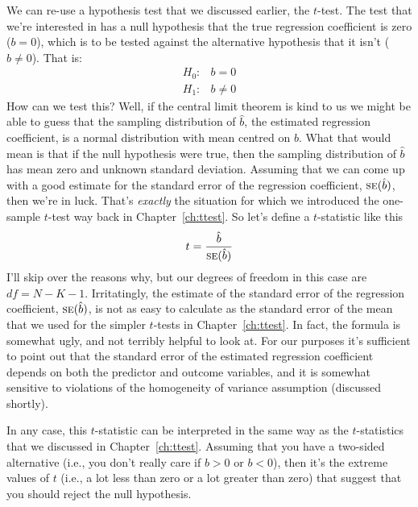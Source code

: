 We can re-use a hypothesis test that we discussed earlier, the $t$-test. The test that we're interested in has a null hypothesis that the true regression coefficient is zero ($b = 0$), which is to be tested against the alternative hypothesis that it isn't ($b \neq 0$). That is:
$$
\begin{array}{rl}
H_0: & b = 0 \\
H_1: & b \neq 0 
\end{array}
$$
How can we test this? Well, if the central limit theorem is kind to us we might be able to guess that the sampling distribution of $\hat{b}$, the estimated regression coefficient, is a normal distribution with mean centred on $b$. What that would mean is that if the null hypothesis were true, then the sampling distribution of $\hat{b}$ has mean zero and unknown standard deviation. Assuming that we can come up with a good estimate for the standard error of the regression coefficient, $\mbox{\textsc{se}}(\hat{b})$, then we're in luck. That's {\it exactly} the situation for which we introduced the one-sample $t$-test way back in Chapter~\ref{ch:ttest}. So let's define a $t$-statistic like this
$$
t = \frac{\hat{b}}{\mbox{\textsc{se}}(\hat{b})}
$$
I'll skip over the reasons why, but our degrees of freedom in this case are $df = N- K- 1$. Irritatingly, the estimate of the standard error of the regression coefficient, $\mbox{\textsc{se}}(\hat{b})$, is not as easy to calculate as the standard error of the mean that we used for the simpler $t$-tests in Chapter~\ref{ch:ttest}. In fact, the formula is somewhat ugly, and not terribly helpful to look at. For our purposes it's sufficient to point out that the standard error of the  estimated regression coefficient depends on both the predictor and outcome variables, and it is somewhat sensitive to violations of the homogeneity of variance assumption (discussed shortly). 

In any case, this $t$-statistic can be interpreted in the same way as the $t$-statistics that we discussed in Chapter~\ref{ch:ttest}. Assuming that you have a two-sided alternative (i.e., you don't really care if $b >0$ or $b < 0$), then it's the extreme values of $t$ (i.e., a lot less than zero or a lot greater than zero) that suggest that you should reject the null hypothesis. 


